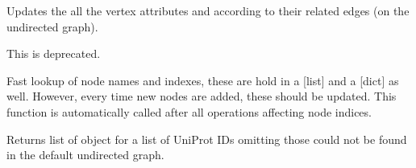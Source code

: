 \documentclass[letterpaper,10pt,english]{sphinxmanual}
\begin{document}
\begin{fulllineitems}

\begin{fulllineitems}
\label{\detokenize{reference:pypath.main.PyPath.update_vertex_sources}}
Updates the all the vertex attributes  and
 according to their related edges (on the
undirected graph).

\end{fulllineitems}


\begin{fulllineitems}
\label{\detokenize{reference:pypath.main.PyPath.update_vindex}}
This is deprecated.

\end{fulllineitems}


\begin{fulllineitems}
\label{\detokenize{reference:pypath.main.PyPath.update_vname}}
Fast lookup of node names and indexes, these are hold in a
{[}list{]} and a {[}dict{]} as well. However, every time new nodes are
added, these should be updated. This function is automatically
called after all operations affecting node indices.

\end{fulllineitems}


\begin{fulllineitems}
\label{\detokenize{reference:pypath.main.PyPath.ups}}
Returns list of  object
for a list of UniProt IDs omitting those
could not be found in the default
undirected graph.

\end{fulllineitems}


\end{fulllineitems}
\end{document}
